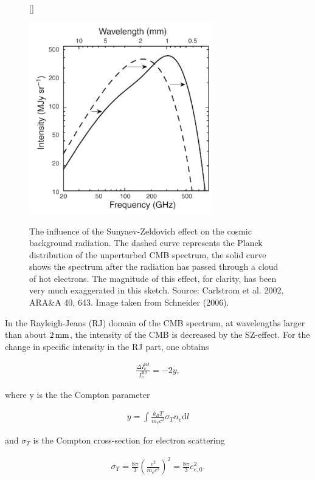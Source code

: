 \documentclass[a4paper,11pt]{article}
\begin{document}
\begin{figure}[h]
    [\FBwidth]
    {\caption{\footnotesize{The influence of the Sunyaev-Zeldovich effect on the cosmic background radiation. The dashed curve represents the Planck distribution of the unperturbed CMB spectrum, the solid curve shows the spectrum after the radiation has passed through a cloud of hot electrons. The magnitude of this effect, for clarity, has been very much exaggerated in this sketch. Source: Carlstrom et al. 2002, ARA\&A 40, 643. Image taken from Schneider (2006).}}
    \label{fig:szeffect}}
    {\includegraphics[width=8cm]{figures/SZeffect.png}}
\end{figure}

{\noindent}In the Rayleigh-Jeans (RJ) domain of the CMB spectrum, at wavelengths larger than about $2\,{\rm mm}$, the intensity of the CMB is decreased by the SZ-effect. For the change in specific intensity in the RJ part, one obtains

\begin{align*}
    \frac{\Delta I_\nu^\mathrm{RJ}}{I_\nu^\mathrm{RJ}} = -2y,
\end{align*}

{\noindent}where y is the the Compton parameter

\begin{align*}
    y = \int\frac{k_BT}{m_ec^2}\sigma_Tn_e\mathrm{d}l
\end{align*}

{\noindent}and $\sigma_T$ is the Compton cross-section for electron scattering

\begin{align*}
    \sigma_T = \frac{8\pi}{3}\left(\frac{e^2}{m_ec^2}\right)^2 = \frac{8\pi}{3}e_{e,0}^2.
\end{align*}
\end{document}
